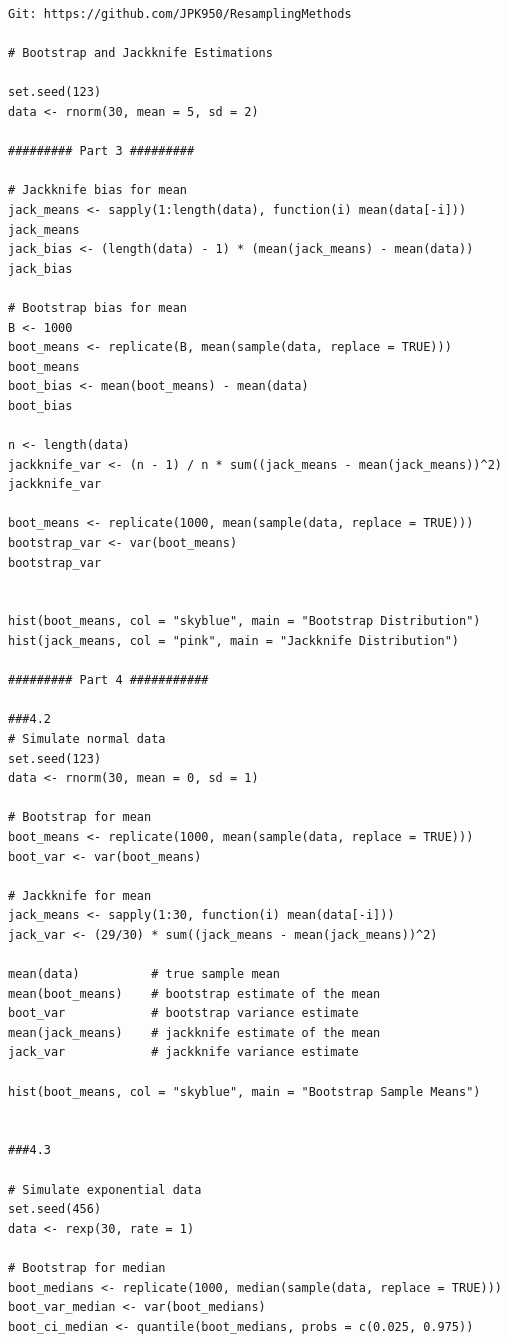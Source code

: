 \documentclass[aodsor,preprint]{imsart}
\numberwithin{equation}{section}
\theoremstyle{plain}
\begin{document}

{}

\newpage

\appendix

\begin{verbatim}
Git: https://github.com/JPK950/ResamplingMethods

# Bootstrap and Jackknife Estimations

set.seed(123)
data <- rnorm(30, mean = 5, sd = 2)

######### Part 3 #########

# Jackknife bias for mean
jack_means <- sapply(1:length(data), function(i) mean(data[-i]))
jack_means
jack_bias <- (length(data) - 1) * (mean(jack_means) - mean(data))
jack_bias

# Bootstrap bias for mean
B <- 1000
boot_means <- replicate(B, mean(sample(data, replace = TRUE)))
boot_means
boot_bias <- mean(boot_means) - mean(data)
boot_bias

n <- length(data)
jackknife_var <- (n - 1) / n * sum((jack_means - mean(jack_means))^2)
jackknife_var  

boot_means <- replicate(1000, mean(sample(data, replace = TRUE)))
bootstrap_var <- var(boot_means)
bootstrap_var


hist(boot_means, col = "skyblue", main = "Bootstrap Distribution")
hist(jack_means, col = "pink", main = "Jackknife Distribution")

######### Part 4 ###########

###4.2
# Simulate normal data
set.seed(123)
data <- rnorm(30, mean = 0, sd = 1)

# Bootstrap for mean
boot_means <- replicate(1000, mean(sample(data, replace = TRUE)))
boot_var <- var(boot_means)

# Jackknife for mean
jack_means <- sapply(1:30, function(i) mean(data[-i]))
jack_var <- (29/30) * sum((jack_means - mean(jack_means))^2)

mean(data)          # true sample mean
mean(boot_means)    # bootstrap estimate of the mean
boot_var            # bootstrap variance estimate
mean(jack_means)    # jackknife estimate of the mean
jack_var            # jackknife variance estimate

hist(boot_means, col = "skyblue", main = "Bootstrap Sample Means")


###4.3

# Simulate exponential data
set.seed(456)
data <- rexp(30, rate = 1)

# Bootstrap for median
boot_medians <- replicate(1000, median(sample(data, replace = TRUE)))
boot_var_median <- var(boot_medians)
boot_ci_median <- quantile(boot_medians, probs = c(0.025, 0.975))


\end{verbatim}
\end{document}
